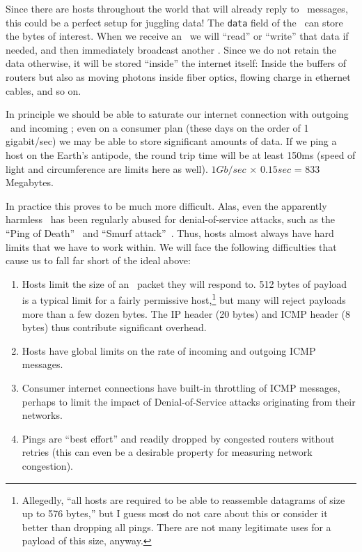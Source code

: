 \documentclass[twocolumn]{article}
\begin{document}
Since there are hosts throughout the world that will already reply to
\icmpecho\ messages, this could be a perfect setup for juggling data!
The {\tt data} field of the \icmpecho\ can store the bytes of interest.
When we receive an \icmpechoreply\ we will ``read'' or ``write'' that
data if needed, and then immediately broadcast another \icmpecho.
Since we do not retain the data otherwise, it will be stored
``inside'' the internet itself: Inside the buffers of routers but also
as moving photons inside fiber optics, flowing charge in ethernet
cables, and so on.

In principle we should be able to saturate our internet connection
with outgoing \icmpecho\ and incoming \icmpechoreply; even on a
consumer plan (these days on the order of 1 gigabit/sec) we may be
able to store significant amounts of data. If we ping a host on the
Earth's antipode, the round trip time will be at least 150ms (speed of
light and circumference are limits here as well). $1 Gb/sec$ $\times$
$0.15 sec$ = 833 Megabytes.

In practice this proves to be much more difficult. Alas, even the
apparently harmless \icmpecho\ has been regularly abused for
denial-of-service attacks, such as the ``Ping of
Death''~\cite{wikipediapingofdeath} and ``Smurf
attack''~\cite{wikipediasmurfattack}. Thus, hosts almost always have
hard limits that we have to work within. We will face the following
difficulties that cause us to fall far short of the ideal above:

\begin{enumerate}
\item Hosts limit the size of an \icmpecho\ packet they will respond to.
  512 bytes of payload is a typical limit for a fairly permissive
  host,\!\footnote{
    Allegedly, ``all hosts are required to be able to reassemble datagrams of
    size up to 576 bytes,''\cite{rfc791} but I guess most do not care about
    this or consider it better than dropping all pings. There are not many
    legitimate uses for a payload of this size, anyway.
  }
  but many will reject payloads more than a few dozen bytes. The IP
  header (20 bytes) and ICMP header (8 bytes) thus contribute significant
  overhead.

\item Hosts have global limits on the rate of incoming and outgoing ICMP
  messages.
\item Consumer internet connections have built-in throttling of ICMP
  messages, perhaps to limit the impact of Denial-of-Service attacks
  originating from their networks.
\item Pings are ``best effort'' and readily dropped by congested
  routers without retries (this can even be a desirable property for
  measuring network congestion).
\end{enumerate}
\end{document}
